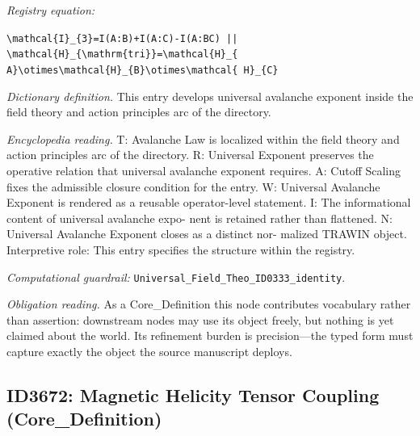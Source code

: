 \documentclass[11pt]{article}
\theoremstyle{remark}
\begin{document}
\noindent\textit{Registry equation:}\par
{\small\texttt{\textbackslash{}mathcal\{I\}\_\{3\}=I(A:B)+I(A:C)-I(A:BC) || \textbackslash{}mathcal\{H\}\_\{\textbackslash{}mathrm\{tri\}\}=\textbackslash{}mathcal\{H\}\_\{ A\}\textbackslash{}otimes\textbackslash{}mathcal\{H\}\_\{B\}\textbackslash{}otimes\textbackslash{}mathcal\{ H\}\_\{C\}}}\par\medskip
\noindent\textit{Dictionary definition.} This entry develops universal avalanche exponent inside the field theory and action principles arc of the directory.\par\medskip
\noindent\textit{Encyclopedia reading.} T: Avalanche Law is localized within the field theory and action principles arc of the directory. R: Universal Exponent preserves the operative relation that universal avalanche exponent requires. A: Cutoff Scaling fixes the admissible closure condition for the entry. W: Universal Avalanche Exponent is rendered as a reusable operator-level statement. I: The informational content of universal avalanche expo- nent is retained rather than flattened. N: Universal Avalanche Exponent closes as a distinct nor- malized TRAWIN object. Interpretive role: This entry specifies the structure within the registry.
\par\medskip\noindent\textit{Computational guardrail:} \texttt{Universal\_Field\_Theo\_ID0333\_identity}.
\par\medskip\noindent\textit{Obligation reading.} As a Core\_Definition this node contributes vocabulary rather than assertion: downstream nodes may use its object freely, but nothing is yet claimed about the world. Its refinement burden is precision---the typed form must capture exactly the object the source manuscript deploys.

\subsection{ID3672: Magnetic Helicity Tensor Coupling (Core\_Definition)}
\end{document}

